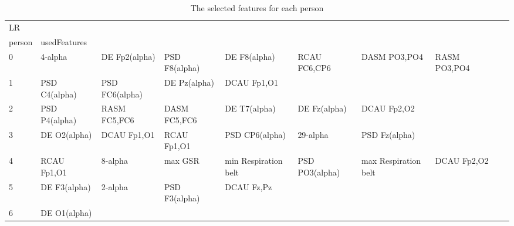 \begin{landscape}
\begin{table}[]
\centering
\caption{The selected features for each person}
\begin{tabular}{l|llllllll}
LR       &                       &                       &                      &                         &                         &                      &                      &                       &                       &                    \\
person   & usedFeatures          &                       &                      &                         &                         &                      &                      &                       &                       &                    \\
0        & 4-alpha               & DE Fp2(alpha)         & PSD F8(alpha)        & DE F8(alpha)            & RCAU FC6,CP6            & DASM PO3,PO4         & RASM PO3,PO4         &                       &                       &                    \\
1        & PSD C4(alpha)         & PSD FC6(alpha)        & DE Pz(alpha)         & DCAU Fp1,O1             &                         &                      &                      &                       &                       &                    \\
2        & PSD P4(alpha)         & RASM FC5,FC6          & DASM FC5,FC6         & DE T7(alpha)            & DE Fz(alpha)            & DCAU Fp2,O2          &                      &                       &                       &                    \\
3        & DE O2(alpha)          & DCAU Fp1,O1           & RCAU Fp1,O1          & PSD CP6(alpha)          & 29-alpha                & PSD Fz(alpha)        &                      &                       &                       &                    \\
4        & RCAU Fp1,O1           & 8-alpha               & max GSR              & min Respiration belt    & PSD PO3(alpha)          & max Respiration belt & DCAU Fp2,O2          &                       &                       &                    \\
5        & DE F3(alpha)          & 2-alpha               & PSD F3(alpha)        & DCAU Fz,Pz              &                         &                      &                      &                       &                       &                    \\
6        & DE O1(alpha)          &                       &                      &                         &                         &                      &                      &                       &                       &                    \\

\end{tabular}
\end{table}
\end{landscape}
